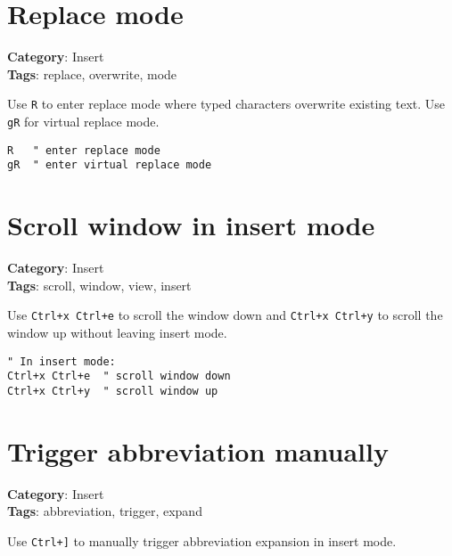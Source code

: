 {{{{{\section{Replace mode}

\textbf{Category}: Insert\\ \textbf{Tags}: replace, overwrite, mode
\vspace{0.5cm}

Use {\footnotesize \Verb§R§} to enter replace mode where typed characters overwrite existing text. Use {\footnotesize \Verb§gR§} for virtual replace mode.

\begin{Exa*}{}
\begin{Verbatim}[fontsize=\footnotesize, breaklines, breakanywhere]
R   " enter replace mode
gR  " enter virtual replace mode
\end{Verbatim}
\end{Exa*}

\section{Scroll window in insert mode}

\textbf{Category}: Insert\\ \textbf{Tags}: scroll, window, view, insert
\vspace{0.5cm}

Use {\footnotesize \Verb§Ctrl+x Ctrl+e§} to scroll the window down and {\footnotesize \Verb§Ctrl+x Ctrl+y§} to scroll the window up without leaving insert mode.

\begin{Exa*}{}
\begin{Verbatim}[fontsize=\footnotesize, breaklines, breakanywhere]
" In insert mode:
Ctrl+x Ctrl+e  " scroll window down
Ctrl+x Ctrl+y  " scroll window up
\end{Verbatim}
\end{Exa*}

\section{Trigger abbreviation manually}

\textbf{Category}: Insert\\ \textbf{Tags}: abbreviation, trigger, expand
\vspace{0.5cm}

Use {\footnotesize \Verb§Ctrl+]§} to manually trigger abbreviation expansion in insert mode.

}}}}}
